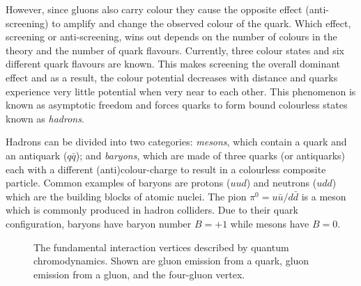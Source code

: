 However, since gluons also carry colour they cause the opposite effect (anti-screening) to amplify and change the observed colour of the quark. Which effect, screening or anti-screening, wins out depends on the number of colours in the theory and the number of quark flavours. Currently, three colour states and six different quark flavours are known. This makes screening the overall dominant effect and as a result, the colour potential decreases with distance and quarks experience very little potential when very near to each other. This phenomenon is known as asymptotic freedom and forces quarks to form bound colourless states known as \emph{hadrons}.

Hadrons can be divided into two categories: \emph{mesons}, which contain a quark and an antiquark ($q\bar{q}$); and \emph{baryons}, which are made of three quarks (or antiquarks) each with a different (anti)colour-charge to result in a colourless composite particle. Common examples of baryons are protons ($uud$) and neutrons ($udd$) which are the building blocks of atomic nuclei. The pion $\pi^{0}=u\bar{u}/d\bar{d}$ is a meson which is commonly produced in hadron colliders. Due to their quark configuration, baryons have baryon number $B=+1$ while mesons have $B=0$.
  
\begin{figure}[htbp]
  \centering
    \begin{minipage}[][][t]{.32\textwidth}
      \centering
      
      \label{fig:TheoryQCDColour}
    \end{minipage}
    \begin{minipage}[][][t]{.32\textwidth}
      \centering
        
        \label{fig:TheoryQCDThreeGluon}
    \end{minipage}
    \begin{minipage}[][][t]{.32\textwidth}
      \centering
        
        \label{fig:TheoryQCDFourGluon}
    \end{minipage}  
    \caption[The fundamental interaction vertices described by quantum chromodynamics.]{The fundamental interaction vertices described by quantum chromodynamics. Shown are  gluon emission from a quark,  gluon emission from a gluon, and  the four-gluon vertex.}\label{fig:TheoryQCDVertexes}
\end{figure}

